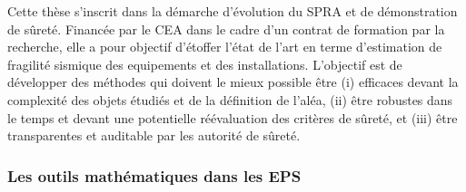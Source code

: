 





Cette thèse s'inscrit dans la démarche d'évolution du SPRA et de démonstration de sûreté. Financée par le CEA dans le cadre d'un contrat de formation par la recherche, elle a pour objectif d'étoffer l'état de l'art en terme d'estimation de fragilité sismique des equipements et des installations.
L'objectif est de développer des méthodes qui doivent le mieux possible être (i) efficaces devant la complexité des objets étudiés et de la définition de l'aléa, (ii) être robustes dans le temps et devant une potentielle réévaluation des critères de sûreté, et (iii) être transparentes et auditable par les autorité de sûreté.






\subsubsection{Les outils mathématiques dans les EPS}


